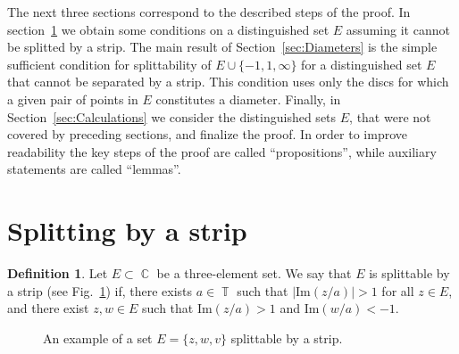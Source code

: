 \documentclass{amsart}
\numberwithin{equation}{section}
\theoremstyle{definition}
\newtheorem{definition}[theorem]{Definition}
\theoremstyle{remark}
\DeclareMathOperator{\CC}{\mathbb C}
\DeclareMathOperator{\TT}{\mathbb T}
\begin{document}
	The next three sections correspond to the described steps of the proof. In section~\ref{sec:Strips} we obtain some conditions on a distinguished set $E$ assuming it cannot be splitted by a strip. The main result of Section~\ref{sec:Diameters} is the simple sufficient condition for splittability of $E \cup \{-1,1,\infty\}$ for a distinguished set $E$ that cannot be separated by a strip. This condition uses only the discs for which a given pair of points in $E$ constitutes a diameter. Finally, in Section~\ref{sec:Calculations} we consider the distinguished sets $E$, that were not covered by preceding sections, and finalize the proof. In order to improve readability the key steps of the proof are called ``propositions'', while auxiliary statements are called ``lemmas''.
	
	\section{Splitting by a strip}\label{sec:Strips}
	
	\begin{definition}\label{defSplittingByAStrip}
		Let $E \subset \CC$ be a three-element set. We say that $E$ is splittable by a strip (see Fig.~\ref{figSplittableByAStrip}) if, there exists $a \in \TT$ such that $|\mathrm{Im}(z/a)| > 1$ for all $z \in E$, and there exist $z,w \in E$ such that $\mathrm{Im}(z/a) > 1$ and $\mathrm{Im}(w/a) < -1$.
	\end{definition}

	\begin{figure}
		\caption{An example of a set $E = \{z,w,v\}$ splittable by a strip.}
		\label{figSplittableByAStrip}
	\end{figure}
	
\end{document}
